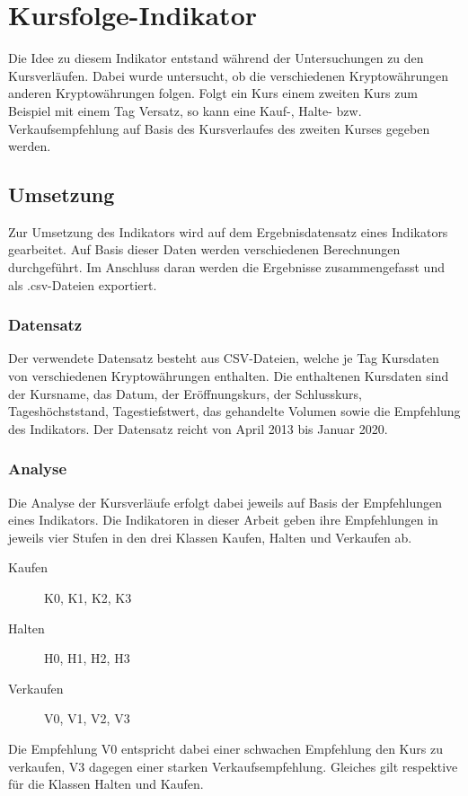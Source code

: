 

\section{Kursfolge-Indikator}
Die Idee zu diesem Indikator entstand während der Untersuchungen zu den Kursverläufen. Dabei wurde untersucht, ob die verschiedenen Kryptowährungen anderen Kryptowährungen folgen. Folgt ein Kurs einem zweiten Kurs zum Beispiel mit einem Tag Versatz, so kann eine Kauf-, Halte- bzw. Verkaufsempfehlung auf Basis des Kursverlaufes des zweiten Kurses gegeben werden.

\subsection{Umsetzung}
Zur Umsetzung des Indikators wird auf dem Ergebnisdatensatz eines Indikators gearbeitet. Auf Basis dieser Daten werden verschiedenen Berechnungen durchgeführt. Im Anschluss daran werden die Ergebnisse zusammengefasst und als .csv-Dateien exportiert. 

\subsubsection{Datensatz}
Der verwendete Datensatz besteht aus CSV-Dateien, welche je Tag Kursdaten von verschiedenen Kryptowährungen enthalten. Die enthaltenen Kursdaten sind der Kursname, das Datum, der Eröffnungskurs, der Schlusskurs, Tageshöchststand, Tagestiefstwert, das gehandelte Volumen sowie die Empfehlung des Indikators. Der Datensatz reicht von April 2013 bis Januar 2020.

\subsubsection{Analyse}
Die Analyse der Kursverläufe erfolgt dabei jeweils auf Basis der Empfehlungen eines Indikators. Die Indikatoren in dieser Arbeit geben ihre Empfehlungen in jeweils vier Stufen in den drei Klassen Kaufen, Halten und Verkaufen ab.
\begin{description}
\item[Kaufen] K0, K1, K2, K3
\item[Halten] H0, H1, H2, H3
\item[Verkaufen] V0, V1, V2, V3
\end{description}

Die Empfehlung V0 entspricht dabei einer schwachen Empfehlung den Kurs zu verkaufen, V3 dagegen einer starken Verkaufsempfehlung. Gleiches gilt respektive für die Klassen Halten und Kaufen.

